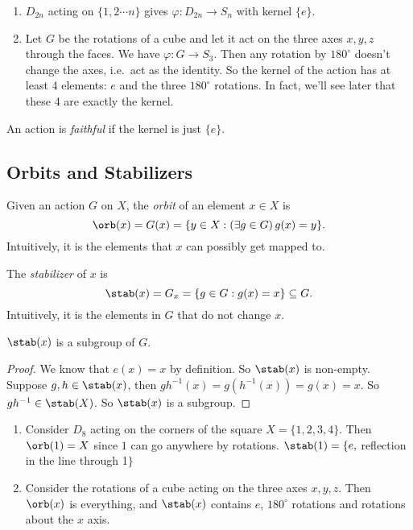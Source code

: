 \documentclass[a4paper]{article}
\begin{document}
\begin{eg}\leavevmode
  \begin{enumerate}
    \item $D_{2n}$ acting on $\{1, 2\cdots n\}$ gives $\varphi: D_{2n}\to S_n$ with kernel $\{e\}$.
    \item Let $G$ be the rotations of a cube and let it act on the three axes $x, y, z$ through the faces. We have $\varphi: G\to S_3$. Then any rotation by $180^\circ$ doesn't change the axes, i.e.\ act as the identity. So the kernel of the action has at least 4 elements: $e$ and the three $180^\circ$ rotations. In fact, we'll see later that these 4 are exactly the kernel.
  \end{enumerate}
\end{eg}

\begin{defi}
  An action is \emph{faithful} if the kernel is just $\{e\}$.
\end{defi}

\subsection{Orbits and Stabilizers}
\begin{defi}
  Given an action $G$ on $X$, the \emph{orbit} of an element $x\in X$ is
  \[
    \orb (x) = G(x) = \{y\in X: (\exists g\in G)\,g(x) = y\}.
  \]
  Intuitively, it is the elements that $x$ can possibly get mapped to.
\end{defi}
\begin{defi}
  The \emph{stabilizer} of $x$ is
  \[
    \stab(x) = G_x = \{g\in G: g(x) = x\}\subseteq G.
  \]
  Intuitively, it is the elements in $G$ that do not change $x$.
\end{defi}

\begin{lemma}
  $\stab(x)$ is a subgroup of $G$.
\end{lemma}

\begin{proof}
  We know that $e(x) = x$ by definition. So $\stab(x)$ is non-empty. Suppose $g, h\in \stab(x)$, then $gh^{-1}(x) = g(h^{-1}(x)) = g(x) = x$. So $gh^{-1}\in \stab (X)$. So $\stab (x)$ is a subgroup.
\end{proof}

\begin{eg}\leavevmode
  \begin{enumerate}
    \item Consider $D_8$ acting on the corners of the square $X = \{1, 2, 3, 4\}$. Then $\orb(1) = X$ since $1$ can go anywhere by rotations. $\stab(1) = \{e, $ reflection in the line through 1$\}$
    \item Consider the rotations of a cube acting on the three axes $x, y, z$. Then $\orb(x)$ is everything, and $\stab(x)$ contains $e$, $180^\circ$ rotations and rotations about the $x$ axis.
  \end{enumerate}
\end{eg}
\end{document}
